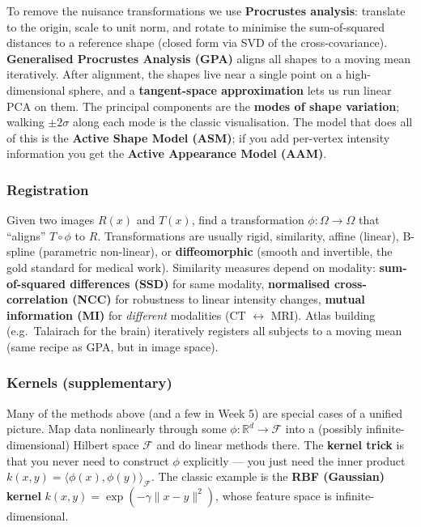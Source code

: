 \documentclass[11pt,a4paper]{article}
\newcommand{\R}{\mathbb{R}}
\begin{document}
To remove the nuisance transformations we use
\textbf{Procrustes analysis}: translate to the origin, scale to
unit norm, and rotate to minimise the sum-of-squared distances to a
reference shape (closed form via SVD of the cross-covariance).
\textbf{Generalised Procrustes Analysis (GPA)} aligns all shapes
to a moving mean iteratively. After alignment, the shapes live near
a single point on a high-dimensional sphere, and a
\textbf{tangent-space approximation} lets us run linear PCA on
them. The principal components are the \textbf{modes of shape
variation}; walking $\pm 2\sigma$ along each mode is the
classic visualisation. The model that does all of this is the
\textbf{Active Shape Model (ASM)}; if you add per-vertex intensity
information you get the \textbf{Active Appearance Model (AAM)}.

\subsubsection{Registration}

Given two images $R(x)$ and $T(x)$, find a transformation
$\phi: \Omega \to \Omega$ that ``aligns'' $T \circ \phi$ to $R$.
Transformations are usually rigid, similarity, affine (linear),
B-spline (parametric non-linear), or \textbf{diffeomorphic} (smooth
and invertible, the gold standard for medical work). Similarity
measures depend on modality:
\textbf{sum-of-squared differences (SSD)} for same modality,
\textbf{normalised cross-correlation (NCC)} for robustness to
linear intensity changes, \textbf{mutual information (MI)} for
\emph{different} modalities (CT $\leftrightarrow$ MRI). Atlas
building (e.g.\ Talairach for the brain) iteratively registers all
subjects to a moving mean (same recipe as GPA, but in image space).

\subsubsection{Kernels (supplementary)}

Many of the methods above (and a few in Week 5) are special cases
of a unified picture. Map data nonlinearly through some
$\phi : \R^d \to \mathcal{F}$ into a (possibly
infinite-dimensional) Hilbert space $\mathcal{F}$ and do linear
methods there. The \textbf{kernel trick} is that you never need to
construct $\phi$ explicitly --- you just need the inner product
$k(x,y) = \langle \phi(x), \phi(y) \rangle_{\mathcal{F}}$. The
classic example is the
\textbf{RBF (Gaussian) kernel} $k(x,y) = \exp(-\gamma\|x-y\|^2)$,
whose feature space is infinite-dimensional.
\end{document}
